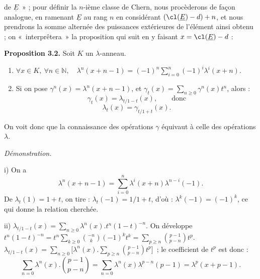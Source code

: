de \(\underline{E}\)~» ;
pour définir la \(n\)-ième classe de Chern, nous procèderons de façon analogue, en ramenant \(\underline{E}\) au rang \(n\) en considérant \((\cl(\underline{E})-d)+n\), et nous prendrons la somme alternée des puissances extérieures de l'élément ainsi obtenu ; on «~interprêtera~» la proposition qui suit en y faisant \(x=\cl(\underline{E})-d\) :

\textbf{Proposition 3.2.} Soit \(K\) un \(\lambda\)-anneau.
\begin{enumerate}[label=\roman*)]
\item \(\forall x\in K,\ \forall n\in\mathbb N,\quad \lambda^n(x+n-1)=(-1)^n\sum_{i=0}^n(-1)^i\lambda^i(x+n).\)
\item Si on pose \(\gamma^n(x)=\lambda^n(x+n-1)\), et \(\gamma_t(x)=\sum_{n\ge0}\gamma^n(x)t^n\), alors :
\[
  \gamma_t(x)=\lambda_{t/1-t}(x),\qquad\text{donc}
\]
\[
  \lambda_t(x)=\gamma_{t/1+t}(x).
\]
\end{enumerate}

On voit donc que la connaissance des opérations \(\gamma\) équivaut à celle des opérations \(\lambda\).

\emph{Démonstration.}

i) On a
\[
  \lambda^n(x+n-1)=\sum_{i=0}^{n}\lambda^i(x+n)\lambda^{n-i}(-1).
\]
De \(\lambda_t(1)=1+t\), on tire : \(\lambda_t(-1)=1/1+t\), d'où : \(\lambda^k(-1)=(-1)^k\), ce qui donne la relation cherchée.

ii) \(\lambda_{t/1-t}(x)=\sum_{n\ge0}\lambda^n(x).t^n(1-t)^{-n}.\)
On développe \(t^n(1-t)^{-n}=t^n\sum_{k\ge0}\binom{-n}{k}(-1)^kt^k=\sum_{p\ge n}\binom{p-1}{p-n}t^p\). \(\lambda_{t/1-t}(x)=\sum_{n\ge0}\bigl[\lambda^n(x).\sum_{p\ge n}\binom{p-1}{p-n}t^p\bigr]\)~; le coefficient de \(t^p\) est donc :
\[
  \sum_{n=0}\lambda^n(x).\binom{p-1}{p-n}
  =\sum_{n=0}\lambda^n(x)\lambda^{p-n}(p-1)
  =\lambda^p(x+p-1).
\]

